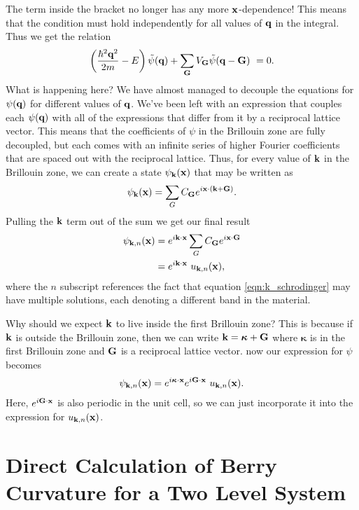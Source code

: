 The term inside the bracket no longer has any more $\bf{x}$-dependence! This means that the condition must hold independently for all values of $\bf{q}$ in the integral. Thus we get the relation
\begin{equation}\label{eqn:k_schrodinger}
    \left ( \frac{\hbar^2 \bf{q}^2}{2m}- E  \right )\tilde{\psi}(\bf{q}) + \sum_\bf{G}V_{\bf{G}} \tilde{\psi}(\bf{q}-\bf{G})\ = 0 .
\end{equation}
What is happening here? We have almost managed to decouple the equations for $\psi(\bf{q})$ for different values of $\bf{q}$. We've been left with an expression that couples each $\psi(\bf{q})$ with all of the expressions that differ from it by a reciprocal lattice vector. This means that the coefficients of $\psi$ in the Brillouin zone are fully decoupled, but each comes with an infinite series of higher Fourier coefficients that are spaced out with the reciprocal lattice. Thus, for every value of $\bf{k}$ in the Brillouin zone, we can create a state $\psi_\bf{k}(\bf{x})$ that may be written as
\begin{align}
    \psi_\bf{k}(\bf{x}) = \sum_{G} C_\bf{G} e^{i\bf{x} \cdot (\bf{k}+\bf{G})}.
\end{align}
Pulling the $\bf{k}$ term out of the sum we get our final result
\begin{align}
    \psi_{\bf{k},n}(\bf{x}) &= e^{i \bf{k} \cdot \bf{x}}\sum_{G} C_\bf{G} e^{i\bf{x} \cdot \bf{G}}  \\
    &=e^{i \bf{k} \cdot \bf{x}}\ u_{\bf{k},n}(\bf{x}),
\end{align}
where the $n$ subscript references the fact that equation \ref{eqn:k_schrodinger} may have multiple solutions, each denoting a different band in the material.\par
Why should we expect $\bf{k}$ to live inside the first Brillouin zone? This is because if $\bf{k}$ is outside the Brillouin zone, then we can write $\bf{k} = \bm{\kappa} + \bf{G}$ where $\bm{\kappa}$ is in the first Brillouin zone and $\bf{G}$ is a reciprocal lattice vector. now our expression for $\psi$ becomes
\begin{align}
    \psi_{\bf{k},n}(\bf{x}) =e^{i \bm{\kappa} \cdot \bf{x}}e^{i \bf{G} \cdot \bf{x}}\ u_{\bf{k},n}(\bf{x}).
\end{align}
Here, $e^{i \bf{G} \cdot \bf{x}}$ is also periodic in the unit cell, so we can just incorporate it into the expression for $u_{\bf{k},n}(\bf{x})$.

\section{Direct Calculation of Berry Curvature for a Two Level System} \label{sec:berry_curvature_two_level}

